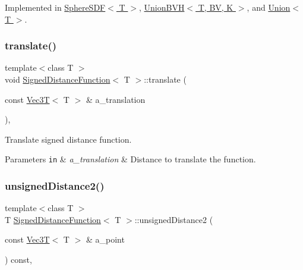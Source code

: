 Implemented in \hyperlink{classSphereSDF_a9b0c5f0b1af2c4b62bee1c873e0158e8}{Sphere\+S\+D\+F$<$ T $>$}, \hyperlink{classUnionBVH_a9681fdc161e2e077a33caaddb78fb4ba}{Union\+B\+V\+H$<$ T, B\+V, K $>$}, and \hyperlink{classUnion_a08beffd354ca261e3d31bcb453951810}{Union$<$ T $>$}.

\mbox{\label{classSignedDistanceFunction_add71ebc2e7f3fb5e85766898413482e7}} 
\subsubsection{\texorpdfstring{translate()}{translate()}}
{\footnotesize\ttfamily template$<$class T $>$ \\
void \hyperlink{classSignedDistanceFunction}{Signed\+Distance\+Function}$<$ T $>$\+::translate (\begin{DoxyParamCaption}\item[{const \hyperlink{classVec3T}{Vec3T}$<$ T $>$ \&}]{a\+\_\+translation }\end{DoxyParamCaption})\hspace{0.3cm}{\ttfamily [inline]}, {\ttfamily [noexcept]}}



Translate signed distance function. 


\begin{DoxyParams}[1]{Parameters}
\mbox{\tt in}  & {\em a\+\_\+translation} & Distance to translate the function. \\
\hline
\end{DoxyParams}
\mbox{\label{classSignedDistanceFunction_a2a3e72186725a4e931db0f8d4895bcb8}} 
\subsubsection{\texorpdfstring{unsigned\+Distance2()}{unsignedDistance2()}}
{\footnotesize\ttfamily template$<$class T $>$ \\
T \hyperlink{classSignedDistanceFunction}{Signed\+Distance\+Function}$<$ T $>$\+::unsigned\+Distance2 (\begin{DoxyParamCaption}\item[{const \hyperlink{classVec3T}{Vec3T}$<$ T $>$ \&}]{a\+\_\+point }\end{DoxyParamCaption}) const\hspace{0.3cm}{\ttfamily [virtual]}, {\ttfamily [noexcept]}}



